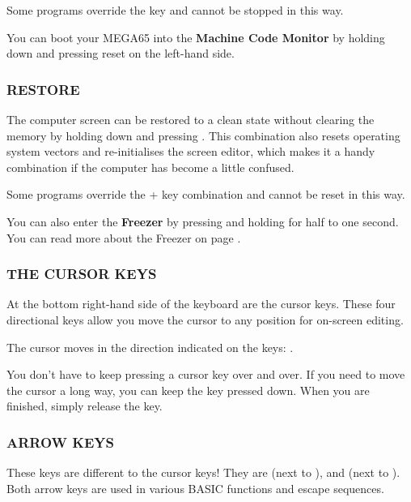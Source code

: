 Some programs override the  key and cannot be stopped in this way.

You can boot your MEGA65 into the {\bf Machine Code Monitor} by holding down  and pressing reset on the left-hand side.

\subsubsection{RESTORE}
The computer screen can be restored to a clean state without clearing the memory by holding down  and pressing . This combination also resets operating system vectors and re-initialises the screen editor, which makes it a handy combination if the computer has become a little confused.

Some programs override the  +  key combination and cannot be reset in this way.

You can also enter the {\bf Freezer} by pressing and holding  for half to one second. You can
read more about the Freezer on page \pageref{sec:freezer}.

\subsubsection{THE CURSOR KEYS}
\nopagebreak
At the bottom right-hand side of the keyboard are the cursor keys. These four directional keys allow you move the cursor to any position for on-screen editing.

The cursor moves in the direction indicated on the keys: \megakey{$\leftarrow$} \megakey{$\uparrow$} \megakey{$\rightarrow$} \megakey{$\downarrow$}.

You don't have to keep pressing a cursor key over and over. If you need to move the cursor a long way, you can keep the key pressed down. When you are finished, simply release the key.

\subsubsection{ARROW KEYS}
These keys are different to the cursor keys! They are \megakeywhite{$\leftarrow$} (next to ), and \megakeywhite{$\uparrow$} (next to ).
Both arrow keys are used in various BASIC functions and escape sequences.

